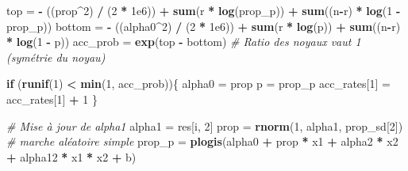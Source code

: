 \documentclass[
]{article}
\newenvironment{Shaded}{\begin{snugshade}}{\end{snugshade}}
\newcommand{\CommentTok}[1]{\textcolor[rgb]{0.56,0.35,0.01}{\textit{#1}}}
\newcommand{\ControlFlowTok}[1]{\textcolor[rgb]{0.13,0.29,0.53}{\textbf{#1}}}
\newcommand{\DecValTok}[1]{\textcolor[rgb]{0.00,0.00,0.81}{#1}}
\newcommand{\FloatTok}[1]{\textcolor[rgb]{0.00,0.00,0.81}{#1}}
\newcommand{\FunctionTok}[1]{\textcolor[rgb]{0.13,0.29,0.53}{\textbf{#1}}}
\newcommand{\NormalTok}[1]{#1}
\newcommand{\OtherTok}[1]{\textcolor[rgb]{0.56,0.35,0.01}{#1}}
\newcommand{\SpecialCharTok}[1]{\textcolor[rgb]{0.81,0.36,0.00}{\textbf{#1}}}
\begin{document}
\begin{Shaded}
\begin{Highlighting}[]
\NormalTok{    top }\OtherTok{=} \SpecialCharTok{{-}}\NormalTok{ ((prop}\SpecialCharTok{\^{}}\DecValTok{2}\NormalTok{) }\SpecialCharTok{/}\NormalTok{ (}\DecValTok{2} \SpecialCharTok{*} \FloatTok{1e6}\NormalTok{)) }\SpecialCharTok{+} \FunctionTok{sum}\NormalTok{(r }\SpecialCharTok{*} \FunctionTok{log}\NormalTok{(prop\_p)) }\SpecialCharTok{+} \FunctionTok{sum}\NormalTok{((n}\SpecialCharTok{{-}}\NormalTok{r) }\SpecialCharTok{*} \FunctionTok{log}\NormalTok{(}\DecValTok{1} \SpecialCharTok{{-}}\NormalTok{ prop\_p))}
\NormalTok{    bottom }\OtherTok{=} \SpecialCharTok{{-}}\NormalTok{ ((alpha0}\SpecialCharTok{\^{}}\DecValTok{2}\NormalTok{) }\SpecialCharTok{/}\NormalTok{ (}\DecValTok{2} \SpecialCharTok{*} \FloatTok{1e6}\NormalTok{)) }\SpecialCharTok{+} \FunctionTok{sum}\NormalTok{(r }\SpecialCharTok{*} \FunctionTok{log}\NormalTok{(p)) }\SpecialCharTok{+} \FunctionTok{sum}\NormalTok{((n}\SpecialCharTok{{-}}\NormalTok{r) }\SpecialCharTok{*} \FunctionTok{log}\NormalTok{(}\DecValTok{1} \SpecialCharTok{{-}}\NormalTok{ p))}
\NormalTok{    acc\_prob }\OtherTok{=} \FunctionTok{exp}\NormalTok{(top }\SpecialCharTok{{-}}\NormalTok{ bottom) }\CommentTok{\# Ratio des noyaux vaut 1 (symétrie du noyau)}
    
    \ControlFlowTok{if}\NormalTok{ (}\FunctionTok{runif}\NormalTok{(}\DecValTok{1}\NormalTok{) }\SpecialCharTok{\textless{}} \FunctionTok{min}\NormalTok{(}\DecValTok{1}\NormalTok{, acc\_prob))\{}
\NormalTok{      alpha0 }\OtherTok{=}\NormalTok{ prop}
\NormalTok{      p }\OtherTok{=}\NormalTok{ prop\_p}
\NormalTok{      acc\_rates[}\DecValTok{1}\NormalTok{] }\OtherTok{=}\NormalTok{ acc\_rates[}\DecValTok{1}\NormalTok{] }\SpecialCharTok{+} \DecValTok{1}
\NormalTok{    \}}
    
    \CommentTok{\# Mise à jour de alpha1}
\NormalTok{    alpha1 }\OtherTok{=}\NormalTok{ res[i, }\DecValTok{2}\NormalTok{]}
\NormalTok{    prop }\OtherTok{=} \FunctionTok{rnorm}\NormalTok{(}\DecValTok{1}\NormalTok{, alpha1, prop\_sd[}\DecValTok{2}\NormalTok{]) }\CommentTok{\# marche aléatoire simple}
\NormalTok{    prop\_p }\OtherTok{=} \FunctionTok{plogis}\NormalTok{(alpha0 }\SpecialCharTok{+}\NormalTok{ prop }\SpecialCharTok{*}\NormalTok{ x1 }\SpecialCharTok{+}\NormalTok{ alpha2 }\SpecialCharTok{*}\NormalTok{ x2 }\SpecialCharTok{+}\NormalTok{ alpha12 }\SpecialCharTok{*}\NormalTok{ x1 }\SpecialCharTok{*}\NormalTok{ x2 }\SpecialCharTok{+}\NormalTok{ b)}
    

\end{Highlighting}
\end{Shaded}
\end{document}
